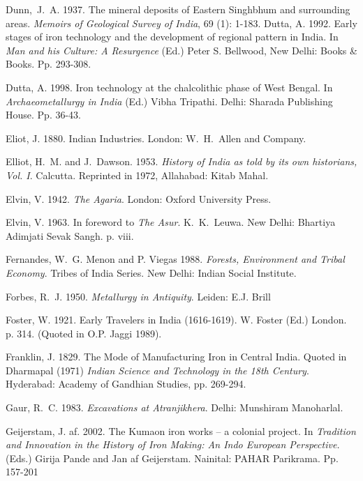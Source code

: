 \begin{thebibliography}{99}
 Dunn,~J.~A. 1937. The mineral deposits of Eastern Singhbhum and surrounding areas. \textit{Memoirs of Geological Survey of India}, 69 (1): 1-183.
 Dutta, A. 1992. Early stages of iron technology and the development of regional pattern in India. In \textit{Man and his Culture: A Resurgence} (Ed.) Peter S. Bellwood, New Delhi: Books \& Books. Pp. 293-308.

 Dutta, A. 1998. Iron technology at the chalcolithic phase of West Bengal. In \textit{Archaeometallurgy in India} (Ed.) Vibha Tripathi. Delhi: Sharada Publishing House. Pp. 36-43.

 Eliot, J. 1880.  Indian Industries. London:  W.~H.~Allen and Company.

 Elliot, H.~M. and J.~Dawson. 1953. \textit{History of India as told by its own historians, Vol. I}. Calcutta. Reprinted in 1972, Allahabad: Kitab Mahal.

 Elvin, V. 1942. \textit{The Agaria}. London: Oxford University Press. 

 Elvin, V. 1963. In foreword to \textit{The Asur}. K.~K.~Leuwa. New Delhi: Bhartiya Adimjati Sevak Sangh. p. viii.

 Fernandes, W.~G. Menon and P. Viegas 1988. \textit{Forests, Environment and Tribal Economy}.  Tribes of India Series. New Delhi: Indian Social Institute.

 Forbes, R.~J. 1950. \textit{Metallurgy in Antiquity}. Leiden: E.J. Brill

 Foster, W. 1921. Early Travelers in India (1616-1619). W. Foster (Ed.) London. p. 314. (Quoted in O.P. Jaggi 1989).

 Franklin, J. 1829. The Mode of Manufacturing Iron in Central India. Quoted in Dharmapal (1971) \textit{Indian Science and Technology in the 18th Century}. Hyderabad: Academy of Gandhian Studies, pp. 269-294. 

 Gaur, R.~C. 1983. \textit{Excavations at Atranjikhera}. Delhi: Munshiram Manoharlal. 

 Geijerstam, J. af. 2002. The Kumaon iron works – a colonial project. In \textit{Tradition and Innovation in the History of Iron Making: An Indo European Perspective.} (Eds.) Girija Pande and Jan af Geijerstam.  Nainital: PAHAR Parikrama. Pp. 157-201


\end{thebibliography}
